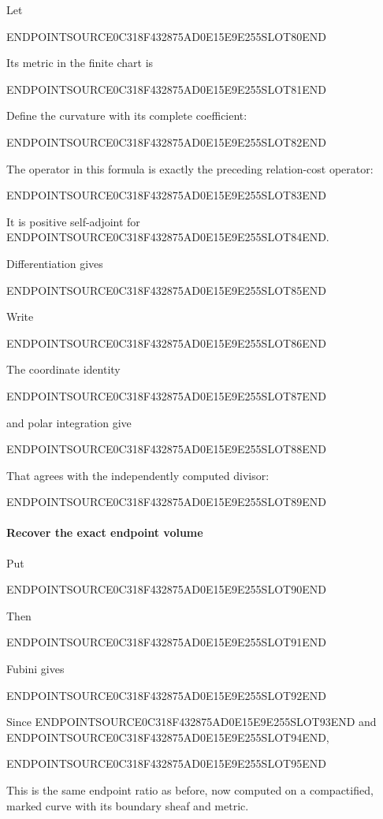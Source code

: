 Let

ENDPOINTSOURCE0C318F432875AD0E15E9E255SLOT80END

Its metric in the finite chart is

ENDPOINTSOURCE0C318F432875AD0E15E9E255SLOT81END

Define the curvature with its complete coefficient:

ENDPOINTSOURCE0C318F432875AD0E15E9E255SLOT82END

The operator in this formula is exactly the preceding relation-cost operator:

ENDPOINTSOURCE0C318F432875AD0E15E9E255SLOT83END

It is positive self-adjoint for ENDPOINTSOURCE0C318F432875AD0E15E9E255SLOT84END.

Differentiation gives

ENDPOINTSOURCE0C318F432875AD0E15E9E255SLOT85END

Write

ENDPOINTSOURCE0C318F432875AD0E15E9E255SLOT86END

The coordinate identity

ENDPOINTSOURCE0C318F432875AD0E15E9E255SLOT87END

and polar integration give

ENDPOINTSOURCE0C318F432875AD0E15E9E255SLOT88END

That agrees with the independently computed divisor:

ENDPOINTSOURCE0C318F432875AD0E15E9E255SLOT89END

\paragraph{Recover the exact endpoint volume}\label{endpoint-curvature_original--recover-the-exact-endpoint-volume}

Put

ENDPOINTSOURCE0C318F432875AD0E15E9E255SLOT90END

Then

ENDPOINTSOURCE0C318F432875AD0E15E9E255SLOT91END

Fubini gives

ENDPOINTSOURCE0C318F432875AD0E15E9E255SLOT92END

Since ENDPOINTSOURCE0C318F432875AD0E15E9E255SLOT93END and ENDPOINTSOURCE0C318F432875AD0E15E9E255SLOT94END,

ENDPOINTSOURCE0C318F432875AD0E15E9E255SLOT95END

This is the same endpoint ratio as before, now computed on a compactified, marked curve with its boundary sheaf and metric.

